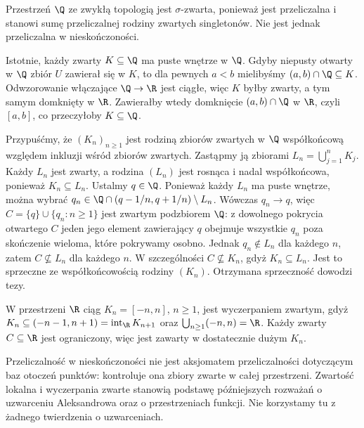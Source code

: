 \begin{przyklad}
\label{ex:topog-lokalna-q-sigma-nieskonczonosc}
Przestrzeń $\Q$ ze zwykłą topologią jest
$\sigma$-zwarta, ponieważ jest przeliczalna
i stanowi sumę przeliczalnej rodziny
zwartych singletonów. Nie jest jednak
przeliczalna w nieskończoności.

Istotnie, każdy zwarty $K\subseteq\Q$
ma puste wnętrze w $\Q$.
Gdyby niepusty otwarty w $\Q$ zbiór
$U$ zawierał się w $K$, to dla pewnych
$a<b$ mielibyśmy
$(a,b)\cap\Q\subseteq K$.
Odwzorowanie włączające $\Q\to\R$
jest ciągłe, więc $K$ byłby
zwarty, a tym samym domknięty w $\R$.
Zawierałby wtedy domknięcie
$(a,b)\cap\Q$ w $\R$, czyli
$[a,b]$, co przeczyłoby
$K\subseteq\Q$.

Przypuśćmy, że $(K_n)_{n\ge1}$
jest rodziną zbiorów zwartych w $\Q$
współkońcową względem inkluzji
wśród zbiorów zwartych.
Zastąpmy ją zbiorami
$L_n=\bigcup_{j=1}^nK_j$.
Każdy $L_n$ jest zwarty, a rodzina
$(L_n)$ jest rosnąca i nadal
współkońcowa, ponieważ $K_n\subseteq L_n$.
Ustalmy $q\in\Q$. Ponieważ
każdy $L_n$ ma puste wnętrze,
można wybrać
$q_n\in\Q\cap(q-1/n,q+1/n)\setminus L_n$.
Wówczas $q_n\to q$, więc
$C=\{q\}\cup\{q_n:n\ge1\}$
jest zwartym podzbiorem $\Q$:
z dowolnego pokrycia otwartego $C$
jeden jego element zawierający $q$
obejmuje wszystkie $q_n$ poza skończenie
wieloma, które pokrywamy osobno.
Jednak $q_n\notin L_n$ dla każdego $n$,
zatem $C\nsubseteq L_n$ dla każdego $n$.
W szczególności $C\nsubseteq K_n$,
gdyż $K_n\subseteq L_n$.
Jest to sprzeczne ze współkońcowością
rodziny $(K_n)$.
Otrzymana sprzeczność dowodzi tezy.
\end{przyklad}

\begin{przyklad}
\label{ex:topog-lokalna-wyczerpanie-r}
W przestrzeni $\R$ ciąg
$K_n=[-n,n]$, $n\ge1$, jest
wyczerpaniem zwartym, gdyż
$K_n\subseteq(-n-1,n+1)
=\operatorname{int}_{\R}K_{n+1}$ oraz
$\bigcup_{n\ge1}(-n,n)=\R$.
Każdy zwarty $C\subseteq\R$
jest ograniczony, więc jest zawarty
w dostatecznie dużym $K_n$.
\end{przyklad}

\begin{uwaga}
Przeliczalność w nieskończoności nie
jest aksjomatem przeliczalności dotyczącym
baz otoczeń punktów: kontroluje ona
zbiory zwarte w całej przestrzeni.
Zwartość lokalna i wyczerpania zwarte
stanowią podstawę późniejszych rozważań
o uzwarceniu Aleksandrowa oraz o
przestrzeniach funkcji. Nie korzystamy
tu z żadnego twierdzenia o uzwarceniach.
\end{uwaga}
